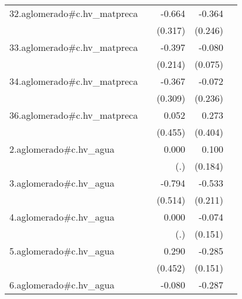 {\begin{longtable}{l*{4}{D{.}{.}{-1}}}
\addlinespace
32.aglomerado#c.hv\_matpreca&                     &      -0.664\sym{*}  &      -0.364         &                     \\
            &                     &     (0.317)         &     (0.246)         &                     \\
\addlinespace
33.aglomerado#c.hv\_matpreca&                     &      -0.397         &      -0.080         &                     \\
            &                     &     (0.214)         &     (0.075)         &                     \\
\addlinespace
34.aglomerado#c.hv\_matpreca&                     &      -0.367         &      -0.072         &                     \\
            &                     &     (0.309)         &     (0.236)         &                     \\
\addlinespace
36.aglomerado#c.hv\_matpreca&                     &       0.052         &       0.273         &                     \\
            &                     &     (0.455)         &     (0.404)         &                     \\
\addlinespace
2.aglomerado#c.hv\_agua&                     &       0.000         &       0.100         &                     \\
            &                     &         (.)         &     (0.184)         &                     \\
\addlinespace
3.aglomerado#c.hv\_agua&                     &      -0.794         &      -0.533\sym{*}  &                     \\
            &                     &     (0.514)         &     (0.211)         &                     \\
\addlinespace
4.aglomerado#c.hv\_agua&                     &       0.000         &      -0.074         &                     \\
            &                     &         (.)         &     (0.151)         &                     \\
\addlinespace
5.aglomerado#c.hv\_agua&                     &       0.290         &      -0.285         &                     \\
            &                     &     (0.452)         &     (0.151)         &                     \\
\addlinespace
6.aglomerado#c.hv\_agua&                     &      -0.080         &      -0.287\sym{*}  &                     \\

\end{longtable}}
